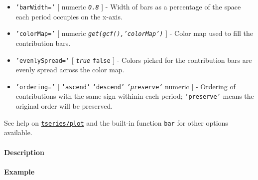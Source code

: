 \begin{itemize}
\item
  \texttt{'barWidth='} {[} numeric \textbar{} \emph{\texttt{0.8}} {]} -
  Width of bars as a percentage of the space each period occupies on the
  x-axis.
\item
  \texttt{'colorMap='} {[} numeric \textbar{}
  \emph{\texttt{get(gcf(),'colorMap')}} {]} - Color map used to fill the
  contribution bars.
\item
  \texttt{'evenlySpread='} {[} \emph{\texttt{true}} \textbar{}
  \texttt{false} {]} - Colors picked for the contribution bars are
  evenly spread across the color map.
\item
  \texttt{'ordering='} {[} \texttt{'ascend'} \textbar{}
  \texttt{'descend'} \textbar{} \emph{\texttt{'preserve'}} \textbar{}
  numeric {]} - Ordering of contributions with the same sign withinin
  each period; \texttt{'preserve'} means the original order will be
  preserved.
\end{itemize}

See help on \href{tseries/plot}{\texttt{tseries/plot}} and the built-in
function \texttt{bar} for other options available.

\paragraph{Description}\label{description}

\paragraph{Example}\label{example}


